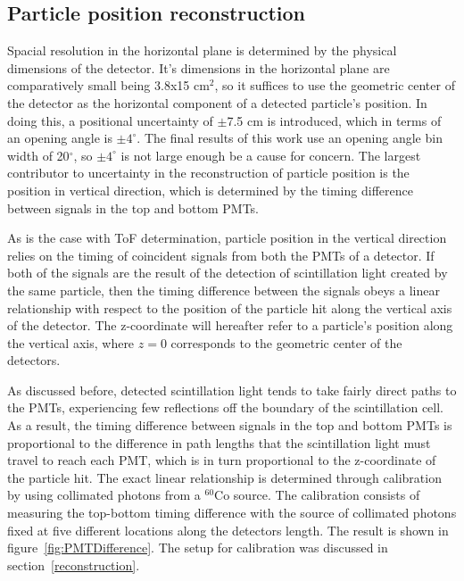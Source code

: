 \subsection{Particle position reconstruction}
Spacial resolution in the horizontal plane is determined by the physical dimensions of the detector. It's dimensions in the horizontal plane are comparatively small being 3.8x15 cm$^2$, so it suffices to use the geometric center of the detector as the horizontal component of a detected particle's position. In doing this, a positional uncertainty of $\pm$7.5 cm is introduced, which in terms of an opening angle is $\pm4^{\circ}$. The final results of this work use an opening angle bin width of 20$^{\circ}$, so $\pm4^{\circ}$ is not large enough be a cause for concern. The largest contributor to uncertainty in the reconstruction of particle position is the position in vertical direction, which is determined by the timing difference between signals in the top and bottom PMTs. 

As is the case with ToF determination, particle position in the vertical direction relies on the timing of coincident signals from both the PMTs of a detector. If both of the signals are the result of the detection of scintillation light created by the same particle, then the timing difference between the signals obeys a linear relationship with respect to the position of the particle hit along the vertical axis of the detector. The z-coordinate will hereafter refer to a particle's position along the vertical axis, where $z=0$ corresponds to the geometric center of the detectors. 

As discussed before, detected scintillation light tends to take fairly direct paths to the PMTs, experiencing few reflections off the boundary of the scintillation cell. As a result, the timing difference between signals in the top and bottom PMTs is proportional to the difference in path lengths that the scintillation light must travel to reach each PMT, which is in turn proportional to the z-coordinate of the particle hit. The exact linear relationship is determined through calibration by using collimated photons from a $^{60}$Co source. The calibration consists of measuring the top-bottom timing difference with the source of collimated photons fixed at five different locations along the detectors length. The result is shown in figure~\ref{fig:PMTDifference}. The setup for calibration was discussed in section~\ref{reconstruction}.

